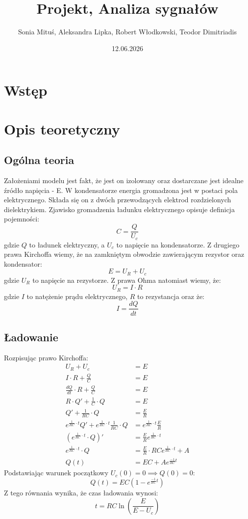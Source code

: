 \documentclass[12pt, a4paper]{article}
\title{Projekt, Analiza sygnałów}
\author{Sonia Mituś, Aleksandra Lipka, Robert Włodkowski, Teodor Dimitriadis}
\date{12.06.2026}
\begin{document}
\maketitle

\section{Wstęp}

\section{Opis teoretyczny}
\subsection{Ogólna teoria}
	Założeniami modelu jest fakt, że jest on izolowany oraz dostarczane jest idealne źródło napięcia - E. W kondensatorze energia gromadzona jest w postaci pola elektrycznego. Składa się on z dwóch przewodzących elektrod rozdzielonych dielektrykiem. Zjawisko gromadzenia ładunku elektrycznego opisuje definicja pojemności:
	$$ C = \frac{Q}{U_c}$$
	gdzie $Q$ to ładunek elektryczny, a $U_c$ to napięcie na kondensatorze.
	Z drugiego prawa Kirchoffa wiemy, że na zamkniętym obwodzie zawierającym rezystor oraz kondensator:
	$$ E = U_R + U_c$$
	gdzie $U_R$ to napięcie na rezystorze. Z prawa Ohma natomiast wiemy, że:
	$$ U_R = I \cdot R $$
	gdzie $I$ to natężenie prądu elektrycznego, $R$ to rezystancja oraz że:
	$$ I = \frac{dQ}{dt}$$
\subsection{Ładowanie}
	Rozpisując prawo Kirchoffa:
	\begin{align*}
		U_R + U_c &= E \\
		I \cdot R + \frac{Q}{C} &= E \\
		\frac{dQ}{dt} \cdot R + \frac{Q}{C} &= E \\
		R \cdot Q' + \frac{1}{C} \cdot Q &= E \\
		Q' + \frac{1}{RC} \cdot Q &= \frac{E}{R} \\
		e^{\frac{1}{RC} \cdot t}Q' + e^{\frac{1}{RC} \cdot t}\frac{1}{RC} \cdot Q &= e^{\frac{1}{RC} \cdot t}\frac{E}{R} \\
		(e^{\frac{1}{RC} \cdot t} \cdot Q)' &= \frac{E}{R} e^{\frac{1}{RC} \cdot t} \\
		e^{\frac{1}{RC} \cdot t} \cdot Q &= \frac{E}{R} \cdot RC e^{\frac{1}{RC} \cdot t} + A\\
		Q(t) &= EC + Ae^{\frac{-1}{RC}t} 
	\end{align*}
	Podstawiając warunek początkowy $U_c(0) = 0 \implies Q(0) = 0$:
	$$Q(t) = EC(1-e^{\frac{-1}{RC}t})$$ 
	Z tego równania wynika, że czas ładowania wynosi:
	$$t = RC \ln(\frac{E}{E - U_c}) $$
\end{document}
